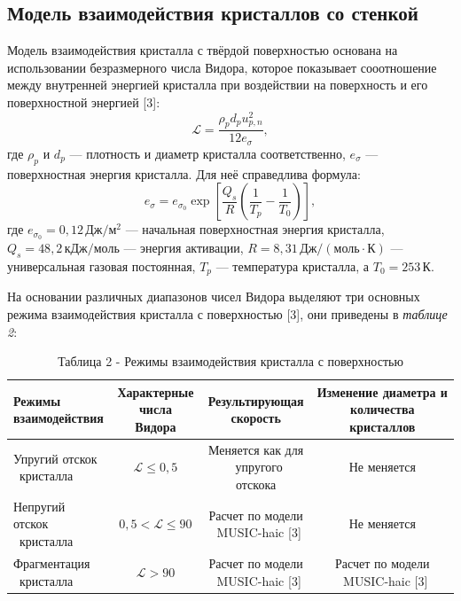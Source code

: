\subsection{Модель взаимодействия кристаллов со стенкой}

Модель взаимодействия кристалла с твёрдой поверхностью основана на использовании безразмерного числа Видора, которое показывает сооотношение между внутренней энергией кристалла при воздействии на поверхность и его поверхностной энергией [3]:
\begin{equation}
	\mathcal{L}=\frac{\rho_p d_p u^2_{p,n}}{12 e_{\sigma}},
\end{equation}
где $\rho_p$ и $d_p$ --- плотность и диаметр кристалла соответственно, $e_{\sigma}$ --- поверхностная энергия кристалла. Для неё справедлива формула:
\begin{equation}
	e_\sigma=e_{\sigma_0} \exp\left[\frac{Q_s}{R}\left(\frac{1}{T_p}-\frac{1}{T_0}\right)\right],
\end{equation}
где $e_{\sigma_0} =0{,}12\, \text{Дж}/\text{м}^2$ --- начальная поверхностная энергия кристалла, $Q_s = 48{,}2\, \text{кДж}/\text{моль}$ --- энергия активации, $R=8{,}31\,\text{Дж}/(\text{моль} \cdot \text{К})$ --- универсальная газовая постоянная, $T_p$ --- температура кристалла, а $T_0 = 253\, \text{К}$.

На основании различных диапазонов чисел Видора выделяют три основных режима взаимодействия кристалла с поверхностью [3], они приведены в \textit{таблице 2}:

\begin{table}[H]
	\caption*{Таблица 2 - Режимы взаимодействия кристалла с поверхностью}
	\small
	\centering
	\begin{tabular}{|l|c|c|c|}
		\hline
		\makecell{\textbf{Режимы}\\\textbf{взаимодействия}} &
		\makecell{\textbf{Характерные}\\\textbf{числа Видора}} &
		\makecell{\textbf{Результирующая}\\\textbf{скорость}} &
		\makecell{\textbf{Изменение диаметра и}\\\textbf{количества кристаллов}} \\
		\hline
		\makecell{Упругий отскок \\\ кристалла} & $\mathcal{L} \leq 0{,}5$ & \makecell{Меняется как для \\\ упругого отскока} & Не меняется \\
		\hline
		\makecell{Непругий отскок \\\ кристалла} & $0{,}5 < \mathcal{L} \leq 90$ & \makecell{Расчет по модели \\\ MUSIC-haic [3]} & Не меняется \\
		\hline
		\makecell{Фрагментация \\\ кристалла} & $\mathcal{L} > 90$ & \makecell{Расчет по модели \\\ MUSIC-haic [3]} & \makecell{Расчет по модели \\\ MUSIC-haic [3]} \\
		\hline
	\end{tabular}
\end{table}
